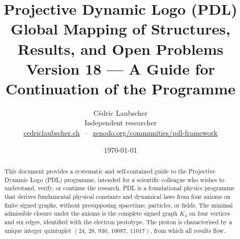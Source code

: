 \documentclass[11pt,a4paper]{article}
\title{Projective Dynamic Logo (PDL)\\[4pt]
\large Global Mapping of Structures, Results, and Open Problems\\[2pt]
\normalsize Version 18 --- A Guide for Continuation of the Programme}
\author{C\'edric Laubscher\\[4pt]
\small Independent researcher\\
\small \href{https://cedriclaubscher.ch}{cedriclaubscher.ch}
$\;\cdot\;$
\small \href{https://zenodo.org/communities/pdl-framework/}{zenodo.org/communities/pdl-framework}}
\date{\today}
\theoremstyle{plain}
\theoremstyle{definition}
\theoremstyle{remark}
\newcommand{\Kfour}{K_4}
\newcommand{\quintuplet}{(24,\,28,\,930,\,10087,\,11017)}
\begin{document}
\maketitle
\setcounter{tocdepth}{2}

\begin{abstract}
This document provides a systematic and self-contained guide to the Projective Dynamic Logo (PDL) programme, intended for a scientific colleague who wishes to understand, verify, or continue the research. PDL is a foundational physics programme that derives fundamental physical constants and dynamical laws from four axioms on finite signed graphs, without presupposing spacetime, particles, or fields. The minimal admissible closure under the axioms is the complete signed graph $\Kfour$ on four vertices and six edges, identified with the electron prototype. The proton is characterised by a unique integer quintuplet $\quintuplet$, from which all results flow.


\end{abstract}
\end{document}
